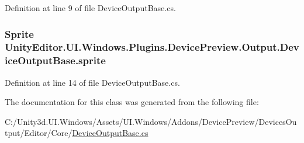Definition at line 9 of file Device\+Output\+Base.\+cs.

\hypertarget{class_unity_editor_1_1_u_i_1_1_windows_1_1_plugins_1_1_device_preview_1_1_output_1_1_device_output_base_a531db0ff5b318ae4f68ab73928401cd9}{}
\subsubsection[{sprite}]{\setlength{\rightskip}{0pt plus 5cm}Sprite Unity\+Editor.\+U\+I.\+Windows.\+Plugins.\+Device\+Preview.\+Output.\+Device\+Output\+Base.\+sprite\hspace{0.3cm}{\ttfamily [protected]}}\label{class_unity_editor_1_1_u_i_1_1_windows_1_1_plugins_1_1_device_preview_1_1_output_1_1_device_output_base_a531db0ff5b318ae4f68ab73928401cd9}


Definition at line 14 of file Device\+Output\+Base.\+cs.



The documentation for this class was generated from the following file\+:\begin{DoxyCompactItemize}
\item 
C\+:/\+Unity3d.\+U\+I.\+Windows/\+Assets/\+U\+I.\+Windows/\+Addons/\+Device\+Preview/\+Devices\+Output/\+Editor/\+Core/\hyperlink{_device_output_base_8cs}{Device\+Output\+Base.\+cs}\end{DoxyCompactItemize}

